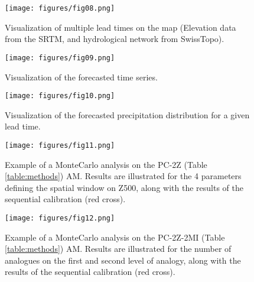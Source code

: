 \documentclass[review]{elsarticle}
\begin{document}
\begin{figure}[t]
	\texttt{[image: figures/fig08.png]}
	\caption{Visualization of multiple lead times on the map (Elevation data from the SRTM, and hydrological network from SwissTopo).}
	\label{figure:atmoswing-viewer-snail}
\end{figure}

\begin{figure}[t]
	\texttt{[image: figures/fig09.png]}
	\caption{Visualization of the forecasted time series.}
	\label{figure:atmoswing-viewer-timeseries}
\end{figure}

\begin{figure}[t]
	\texttt{[image: figures/fig10.png]}
	\caption{Visualization of the forecasted precipitation distribution for a given lead time.}
	\label{figure:atmoswing-viewer-distribution}
\end{figure}

\begin{figure}[t]
	\texttt{[image: figures/fig11.png]}
	\caption{Example of a Monte\textendash Carlo analysis on the PC-2Z (Table \ref{table:methods}) AM. Results are illustrated for the 4 parameters defining the spatial window on Z500, along with the results of the sequential calibration (red cross).}
	\label{figure:monte_carlo_r1}
\end{figure}

\begin{figure}[t]
	\texttt{[image: figures/fig12.png]}
	\caption{Example of a Monte\textendash Carlo analysis on the PC-2Z-2MI (Table \ref{table:methods}) AM. Results are illustrated for the number of analogues on the first and second level of analogy, along with the results of the sequential calibration (red cross).}
	\label{figure:monte_carlo_r2}
\end{figure}

\clearpage
\end{document}

